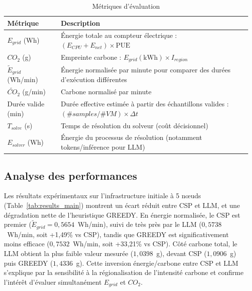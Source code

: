 ﻿\documentclass[systeme]{compas2026}
\begin{document}
\begin{table}[H]
    \centering
    \footnotesize
    \caption{Métriques d'évaluation}
    \label{tab:metrics}
    \begin{tabularx}{\columnwidth}{l X}
        \toprule
        \textbf{Métrique} & \textbf{Description} \\
        \midrule
        $E_{grid}$ (Wh)     & Énergie totale au compteur électrique : $(E_{CPU}+E_{net})\times\text{PUE}$ \\
        $CO_2$ (g)          & Empreinte carbone : $E_{grid}(\text{kWh})\times I_{region}$ \\
        $\widetilde{E}_{grid}$ (Wh/min) & Énergie normalisée par minute pour comparer des durées d'exécution différentes \\
        $\widetilde{CO}_2$ (g/min)      & Carbone normalisé par minute \\
        Durée valide (min)  & Durée effective estimée à partir des échantillons valides : $(\#samples/\#VM)\times\Delta t$ \\
        $T_{solve}$ (s)     & Temps de résolution du solveur (coût décisionnel) \\
        $E_{solver}$ (Wh)   & Énergie du processus de résolution (notamment tokens/inférence pour LLM) \\
        \bottomrule
    \end{tabularx}
\end{table}

\subsection{Analyse des performances}
Les résultats expérimentaux sur l'infrastructure initiale à 5 nœuds (Table~\ref{tab:results_main}) montrent un écart réduit entre CSP et LLM, et une dégradation nette de l'heuristique GREEDY. En énergie normalisée, le CSP est premier ($\widetilde{E}_{grid}=0{,}5654$~Wh/min), suivi de très près par le LLM ($0{,}5738$~Wh/min, soit +1{,}49\% vs CSP), tandis que GREEDY est significativement moins efficace ($0{,}7532$~Wh/min, soit +33{,}21\% vs CSP). Côté carbone total, le LLM obtient la plus faible valeur mesurée ($1{,}0398$~g), devant CSP ($1{,}0906$~g) puis GREEDY ($1{,}4336$~g). Cette inversion énergie/carbone entre CSP et LLM s'explique par la sensibilité à la régionalisation de l'intensité carbone et confirme l'intérêt d'évaluer simultanément $E_{grid}$ et $CO_2$.
\end{document}
